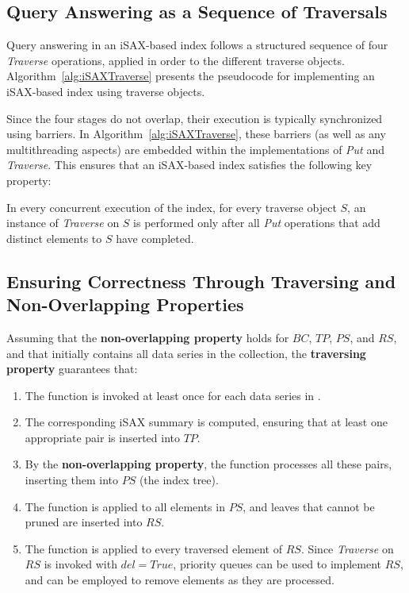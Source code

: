 \subsection{Query Answering as a Sequence of Traversals}

Query answering in an iSAX-based index follows a structured sequence of four
\textit{Traverse} operations, applied in order to the different traverse objects.  
Algorithm~\ref{alg:iSAXTraverse} presents the pseudocode for implementing an iSAX-based index
using traverse objects.

Since the four stages do not overlap, their execution is typically synchronized
using barriers. In Algorithm~\ref{alg:iSAXTraverse}, these barriers (as well as any 
multithreading aspects) are embedded within the implementations of \textit{Put}
and \textit{Traverse}. This ensures that an iSAX-based index satisfies the
following key property:

\begin{definition}
\label{def:non-overlapping}
In every concurrent execution of the index, for every traverse object $S$, an
instance of \textit{Traverse} on $S$ is performed only after all \textit{Put}
operations that add distinct elements to $S$ have completed.
\end{definition}

\subsection{Ensuring Correctness Through Traversing and\\ Non-Overlapping Properties}

Assuming that the \textbf{non-overlapping property} holds for $BC$, $TP$, $PS$,
and $RS$, and that \RawData initially contains all data series in the collection,
the \textbf{traversing property} guarantees that:

\begin{enumerate}
    \item The \BufferCreation function is invoked at least once for each data
     series in \RawData.
    \item The corresponding iSAX summary is computed, ensuring that at least one
     appropriate pair is inserted into $TP$.
    \item By the \textbf{non-overlapping property}, the \TreePopulation function
     processes all these pairs, inserting them into $PS$ (the index tree).
    \item The \Prunning function is applied to all elements in $PS$, and leaves
     that cannot be pruned are inserted into $RS$.
    \item The \Refinement function is applied to every traversed element of $RS$.
     Since \textit{Traverse} on $RS$ is invoked with $del = \mathit{True}$,
    priority queues can be used to implement $RS$, and \DeleteMin can be employed
    to remove elements as they are processed.
\end{enumerate}

